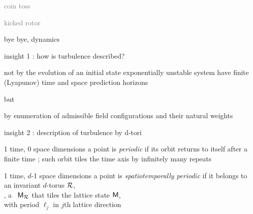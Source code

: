 \begin{frame}{}
\begin{enumerate}
              \item \textcolor{gray}{\small
coin toss
              \item
kicked rotor
              \item
\catlatt
                  }
              \item {\Large
bye bye, dynamics
                    }
            \end{enumerate}
\end{frame} %

\begin{frame}{insight 1 : how is turbulence described?}
\begin{block}{not by the evolution of an initial state}
exponentially unstable system have finite (Lyapunov) time and
space prediction horizons
\end{block}
but
\bigskip

\begin{block}{by enumeration of admissible field configurations}
and their natural weights
\end{block}
\end{frame} %

\begin{frame}{insight 2 : description of turbulence by d-tori}
\begin{block}{1 time, 0 space dimensions}
a {\statesp} point is {\em periodic} if its orbit returns to itself
after a finite time \period{}; such orbit tiles the time axis
by infinitely many repeats
\end{block}

\bigskip

\begin{block}{1 time, $d$-1 space dimensions}
 a {\statesp} point is {\em spatiotemporally periodic} if
it belongs to \\ an invariant $d$-torus ${\mathcal{R}}$,\\
\ie, a \brick\ $\mathsf{M}_{\mathcal{R}}$ that
tiles the lattice state  $\mathsf{M}$, \\
with period $\ell_j$ in $j$th lattice direction
\end{block}
\end{frame} %

